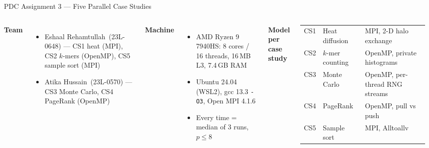 \documentclass[aspectratio=169,10pt]{beamer}
\newcommand{\memberA}{Eshaal Rehamtullah}
\newcommand{\memberB}{Atika Hussain}
\begin{document}
\begin{frame}{PDC Assignment 3 --- Five Parallel Case Studies}
\begin{columns}[T]
\textbf{Team}
\begin{itemize}\small
  \item \memberA\ (23L-0648) --- CS1 heat (MPI), CS2 $k$-mers (OpenMP), CS5 sample sort (MPI)
  \item \memberB\ (23L-0570) --- CS3 Monte Carlo, CS4 PageRank (OpenMP)
\end{itemize}
\textbf{Machine}
\begin{itemize}\small
  \item AMD Ryzen 9 7940HS: 8 cores / 16 threads, 16\,MB L3, 7.4\,GB RAM
  \item Ubuntu 24.04 (WSL2), gcc 13.3 \texttt{-O3}, Open MPI 4.1.6
  \item Every time = median of 3 runs, $p \le 8$
\end{itemize}
\textbf{Model per case study}\\[0.3em]
\small
\begin{tabular}{@{}lll@{}}
\toprule
CS1 & Heat diffusion   & MPI, 2-D halo exchange \\
CS2 & $k$-mer counting & OpenMP, private histograms \\
CS3 & Monte Carlo      & OpenMP, per-thread RNG streams \\
CS4 & PageRank         & OpenMP, pull vs push \\
CS5 & Sample sort      & MPI, Alltoallv \\
\bottomrule
\end{tabular}
\end{columns}
\end{frame}
\end{document}
